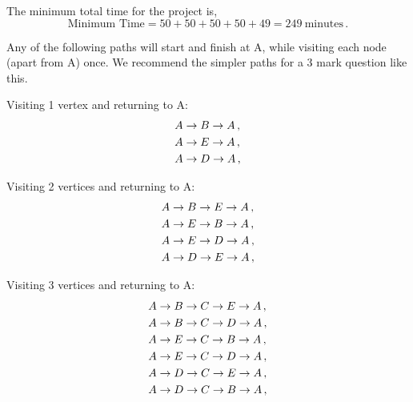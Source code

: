\begin{subquestions}
\begin{subsubquestions}
The minimum total time for the project is,
\begin{equation}
	\text{Minimum Time} = 50+50+50+50+49 = 249 ~\text{minutes}\,.
\end{equation}

\end{subsubquestions}


\subquestion

Any of the following paths will start and finish at A, while visiting each node (apart from A) once. We recommend the simpler paths for a 3 mark question like this.

Visiting 1 vertex and returning to A:
\begin{align}
& A \rightarrow B \rightarrow A \,, \nonumber \\
& A \rightarrow E  \rightarrow A \,, \nonumber \\
& A \rightarrow D  \rightarrow A \,, \nonumber
\end{align}

Visiting 2 vertices and returning to A:
\begin{align}
& A \rightarrow B \rightarrow E \rightarrow A \,, \nonumber \\
& A \rightarrow E \rightarrow B \rightarrow A \,, \nonumber \\
& A \rightarrow E \rightarrow D \rightarrow A \,, \nonumber \\
& A \rightarrow D \rightarrow E \rightarrow A \,, \nonumber
\end{align}

Visiting 3 vertices and returning to A:
\begin{align}
& A \rightarrow B \rightarrow C \rightarrow E \rightarrow A \,, \nonumber \\
& A \rightarrow B \rightarrow C \rightarrow D \rightarrow A \,, \nonumber \\
& A \rightarrow E \rightarrow C \rightarrow B \rightarrow A \,, \nonumber \\
& A \rightarrow E \rightarrow C \rightarrow D \rightarrow A \,, \nonumber \\
& A \rightarrow D \rightarrow C \rightarrow E \rightarrow A \,, \nonumber \\
& A \rightarrow D \rightarrow C \rightarrow B \rightarrow A \,, \nonumber
\end{align}


\end{subquestions}
